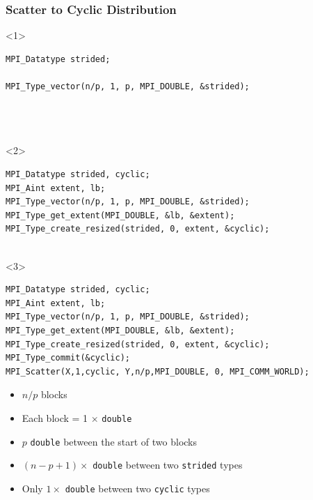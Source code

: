 \documentclass[xcolor={rgb,x11names,svgnames},rgb,x11names,svgnames]{beamer}
\newenvironment{wider}{%
\begin{adjustwidth}{-0.6cm}{}%
  \begin{minipage}{12cm}%
}{%
\end{minipage}%
\end{adjustwidth}%
}
\begin{document}
\begin{frame}[label=cyclic,fragile]
\frametitle{Scatter to Cyclic Distribution}

\begin{overlayarea}{12cm}{3.5cm}
\begin{wider}
  \begin{onlyenv}<1>
\begin{verbatim}
MPI_Datatype strided;

MPI_Type_vector(n/p, 1, p, MPI_DOUBLE, &strided);




\end{verbatim}
\end{onlyenv}

\begin{onlyenv}<2>
\begin{verbatim}
MPI_Datatype strided, cyclic;
MPI_Aint extent, lb;
MPI_Type_vector(n/p, 1, p, MPI_DOUBLE, &strided);
MPI_Type_get_extent(MPI_DOUBLE, &lb, &extent);
MPI_Type_create_resized(strided, 0, extent, &cyclic);


\end{verbatim}
\end{onlyenv}

\begin{onlyenv}<3>
\begin{verbatim}
MPI_Datatype strided, cyclic;
MPI_Aint extent, lb;
MPI_Type_vector(n/p, 1, p, MPI_DOUBLE, &strided);
MPI_Type_get_extent(MPI_DOUBLE, &lb, &extent);
MPI_Type_create_resized(strided, 0, extent, &cyclic);
MPI_Type_commit(&cyclic);
MPI_Scatter(X,1,cyclic, Y,n/p,MPI_DOUBLE, 0, MPI_COMM_WORLD);
\end{verbatim}
\end{onlyenv}
\end{wider}
\end{overlayarea}

\begin{itemize}
\item $n/p$ blocks
\item Each block = 1 $\times$ \texttt{double}
\item $p$ \texttt{double} between the start of two blocks
\item<only@1> $(n-p+1) \times$ \texttt{double} between two \texttt{strided} types
\item<only@2-> Only $1 \times$ \texttt{double} between two \texttt{cyclic} types
\end{itemize}


\end{frame}
\end{document}
